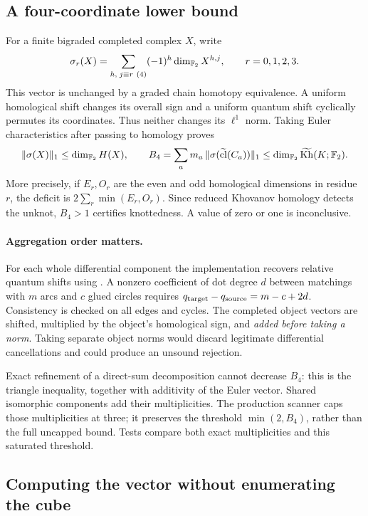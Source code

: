 \subsection{A four-coordinate lower bound}

For a finite bigraded completed complex $X$, write
\[
 \sigma_r(X)=\sum_{h,\;j\equiv r\ (4)}(-1)^h\dim_{\F} X^{h,j},
 \qquad r=0,1,2,3.
\]
This vector is unchanged by a graded chain homotopy equivalence.  A uniform
homological shift changes its overall sign and a uniform quantum shift
cyclically permutes its coordinates.  Thus neither changes its $\ell^1$
norm.  Taking Euler characteristics after passing to homology proves
\[
 \|\sigma(X)\|_1\leq\dim_{\mathbb{F}_2} H(X),\qquad
 B_4=\sum_a m_a\,
 \|\sigma(\widetilde{\operatorname{cl}}(C_a))\|_1
 \leq\dim_{\mathbb{F}_2}\widetilde{\mathrm{Kh}}(K;\mathbb{F}_2).
\]
More precisely, if $E_r,O_r$ are the even and odd homological dimensions
in residue $r$, the deficit is $2\sum_r\min(E_r,O_r)$.
Since reduced Khovanov homology detects the unknot, $B_4>1$ certifies
knottedness.  A value of zero or one is inconclusive.

\paragraph{Aggregation order matters.}
For each whole differential component the implementation recovers relative
quantum shifts using .  A nonzero coefficient of dot
degree $d$ between matchings with $m$ arcs and $c$ glued circles requires
$q_{\rm target}-q_{\rm source}=m-c+2d$.  Consistency is checked on all
edges and cycles.  The completed object vectors are shifted, multiplied
by the object's homological sign, and \emph{added before taking a norm}.
Taking separate object norms would discard legitimate differential
cancellations and could produce an unsound rejection.

Exact refinement of a direct-sum decomposition cannot decrease $B_4$:
this is the triangle inequality, together with additivity of the Euler
vector.  Shared isomorphic components add their multiplicities.  The
production scanner caps those multiplicities at three; it preserves
the threshold $\min(2,B_4)$, rather than the full uncapped bound.
Tests compare both exact multiplicities and this saturated threshold.

\subsection{Computing the vector without enumerating the cube}

